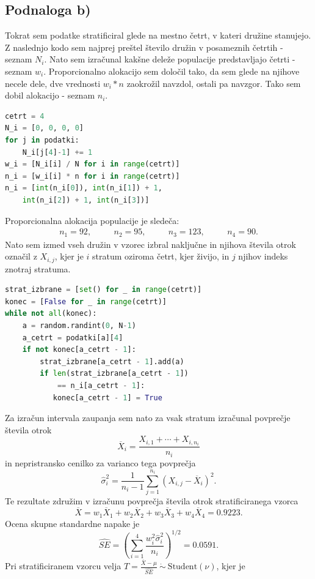 \documentclass[12pt, a4paper]{article}
\begin{document}
\subsection*{Podnaloga b)}
Tokrat sem podatke stratificiral glede na mestno četrt, v kateri družine stanujejo. Z naslednjo kodo sem najprej preštel število družin v posameznih četrtih - seznam $N_i$. Nato sem izračunal kakšne deleže populacije predstavljajo četrti - seznam $w_i$. Proporcionalno alokacijo sem določil tako, da sem glede na njihove necele dele, dve vrednosti $w_i * n$ zaokrožil navzdol, ostali pa navzgor. Tako sem dobil alokacijo - seznam $n_i$.
\begin{lstlisting}[language=Python]
cetrt = 4
N_i = [0, 0, 0, 0]
for j in podatki:
    N_i[j[4]-1] += 1
w_i = [N_i[i] / N for i in range(cetrt)]
n_i = [w_i[i] * n for i in range(cetrt)]
n_i = [int(n_i[0]), int(n_i[1]) + 1, 
	int(n_i[2]) + 1, int(n_i[3])]  
\end{lstlisting}
Proporcionalna alokacija populacije je sledeča:
\begin{align*}
n_1 = 92, & \quad & n_2 = 95, & \quad & n_3 = 123, & \quad & n_4 = 90.
\end{align*}
Nato sem izmed vseh družin v vzorec izbral naključne in njihova števila otrok označil z $X_{i, j}$, kjer je $i$ stratum oziroma četrt, kjer živijo, in $j$ njihov indeks znotraj stratuma.
\newpage
\begin{lstlisting}[language=Python]
strat_izbrane = [set() for _ in range(cetrt)]
konec = [False for _ in range(cetrt)]
while not all(konec):
    a = random.randint(0, N-1)
    a_cetrt = podatki[a][4]
    if not konec[a_cetrt - 1]:
        strat_izbrane[a_cetrt - 1].add(a)
        if len(strat_izbrane[a_cetrt - 1]) 
        	== n_i[a_cetrt - 1]:
           konec[a_cetrt - 1] = True
\end{lstlisting}
Za izračun intervala zaupanja sem nato za vsak stratum izračunal povprečje števila otrok
\[
\overline{X}_i = \frac{X_{i, 1} + \cdots + X_{i, n_i}}{n_i}
\]
in nepristransko cenilko za varianco tega povprečja
\[
\widehat{\sigma}_i^2 = \frac{1}{n_i-1} \sum_{j=1}^{n_i}\left( X_{i, j} - \overline{X}_i \right)^2.
\]
Te rezultate združim v izračunu povprečja števila otrok stratificiranega vzorca
\[
\overline{X} = w_1\overline{X}_1 + w_2\overline{X}_2 + w_3\overline{X}_3 + w_4\overline{X}_4 =  0.9223.
\]
Ocena skupne standardne napake je 
\[
\widehat{SE} = \left( \sum_{i = 1}^4 \frac{w_i^2 \widehat{\sigma}_i^2}{n_i} \right)^{1/2} =  0.0591.
\]
Pri stratificiranem vzorcu velja $T = \frac{\overline{X}-\mu}{\widehat{SE}}\ \dot{\bm{\sim}}\ \text{Student}(\nu)$, kjer je
\end{document}
